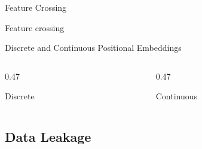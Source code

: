 \begin{frame}{Feature Crossing}
  \begin{tdcodet}{Feature crossing}
  \end{tdcodet}
\end{frame}

\begin{frame}{Discrete and Continuous Positional Embeddings}
  \begin{columns}[T,onlytextwidth]
    \begin{column}{0.47\textwidth}
      \begin{tdblockt}[equal height group=pos]{Discrete}
      \end{tdblockt}
    \end{column}
    \begin{column}{0.47\textwidth}
      \begin{tdblockt}[equal height group=pos]{Continuous}
      \end{tdblockt}
    \end{column}
  \end{columns}
\end{frame}

\subsection{Data Leakage}


